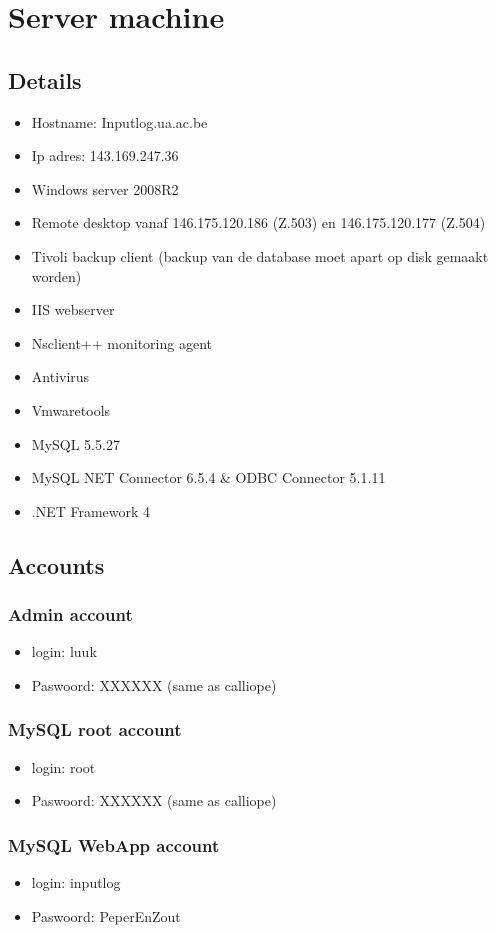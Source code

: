 \documentclass[a4paper,11pt]{report}
\begin{document}
\section{Server machine}
\subsection{Details}
\begin{itemize}
\item Hostname: Inputlog.ua.ac.be
\item Ip adres: 143.169.247.36
\item Windows server 2008R2
\item Remote desktop vanaf 146.175.120.186 (Z.503) en  146.175.120.177 (Z.504)
\item Tivoli backup client (backup van de database moet apart op disk gemaakt worden)
\item IIS webserver
\item Nsclient++ monitoring agent
\item Antivirus
\item Vmwaretools
\item MySQL 5.5.27
\item MySQL NET Connector 6.5.4 \& ODBC Connector 5.1.11
\item .NET Framework 4
\end{itemize}

\subsection{Accounts}
\subsubsection{Admin account}
\begin{itemize}
\item login: luuk
\item Paswoord: XXXXXX (same as calliope)
\end{itemize}

\subsubsection{MySQL root account}
\begin{itemize}
\item login: root
\item Paswoord: XXXXXX (same as calliope)
\end{itemize}

\subsubsection{MySQL WebApp account}
\begin{itemize}
\item login: inputlog
\item Paswoord: PeperEnZout
\end{itemize}
\end{document}
